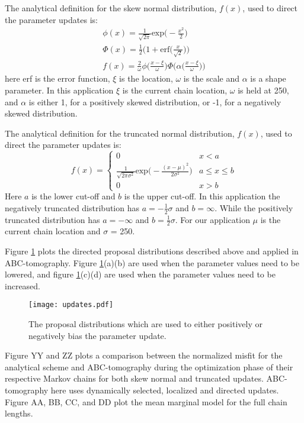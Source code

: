The analytical definition for the skew normal distribution, $f(x)$, used to direct the parameter updates is:
\begin{equation}
\begin{split}
\phi(x) = \frac{1}{\sqrt{2\pi}}\text{exp}\Big(-\frac{x^2}{2}\Big) \\
\Phi(x) = \frac{1}{2}\bigg(1 + \text{erf}\Big(\frac{x}{\sqrt{2}}\Big)\bigg)\\
f(x) = \frac{2}{\omega} \phi\bigg(\frac{x-\xi}{\omega}\bigg)\Phi\bigg(\alpha \Big(\frac{x-\xi}{\omega}\Big)\bigg)
\end{split}
\label{skew-normal-dist}
\end{equation}
here erf is the error function, $\xi$ is the location, $\omega$ is the scale and $\alpha$ is a shape parameter. In this application  $\xi$ is the current chain location, $\omega$ is held at 250, and $\alpha$ is either 1, for a positively skewed distribution, or -1, for a negatively skewed distribution. \par
The analytical definition for the truncated normal distribution, $f(x)$, used to direct the parameter updates is:
\begin{equation}
	f(x) = \begin{cases} 
	0 & x < a \\
	\frac{1}{\sqrt{2\pi\sigma^2}}\text{exp}\Big(-\frac{(x-\mu)^2}{2\sigma^2}\Big) & a\leq x\leq b \\
	0 & x > b 
	\end{cases}
\end{equation}
Here $a$ is the lower cut-off and $b$ is the upper cut-off. In this application the negatively truncated distribution has $a = -\frac{1}{2}\sigma$ and $b = \infty$. While the positively truncated distribution has $a = -\infty$ and $b = \frac{1}{2}\sigma$. For our application $\mu$ is the current chain location and $\sigma$ = 250. \par
Figure \ref{updates} plots the directed proposal distributions described above and applied in ABC-tomography. Figure \ref{updates}(a)(b) are used when the parameter values need to be lowered, and figure \ref{updates}(c)(d) are used when the parameter values need to be increased. 

\begin{figure}[H]
	\centering
	\texttt{[image: updates.pdf]}
	\caption{The proposal distributions which are used to either positively or negatively bias the parameter update. }
	\label{updates}
\end{figure}


Figure YY and ZZ plots a comparison between the normalized misfit for the analytical scheme and ABC-tomography during the optimization phase of their respective Markov chains for both skew normal and truncated updates. ABC-tomography here uses dynamically selected, localized and directed updates. Figure AA, BB, CC, and DD plot the mean marginal model for the full chain lengths. \par



